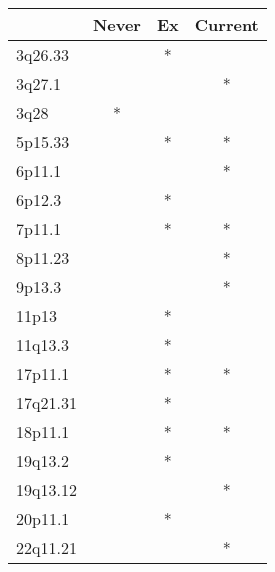 \begin{tabular}{lccc}
\toprule
{} & Never & Ex & Current \\
\midrule
3q26.33  &       &  * &         \\
3q27.1   &       &    &       * \\
3q28     &     * &    &         \\
5p15.33  &       &  * &       * \\
6p11.1   &       &    &       * \\
6p12.3   &       &  * &         \\
7p11.1   &       &  * &       * \\
8p11.23  &       &    &       * \\
9p13.3   &       &    &       * \\
11p13    &       &  * &         \\
11q13.3  &       &  * &         \\
17p11.1  &       &  * &       * \\
17q21.31 &       &  * &         \\
18p11.1  &       &  * &       * \\
19q13.2  &       &  * &         \\
19q13.12 &       &    &       * \\
20p11.1  &       &  * &         \\
22q11.21 &       &    &       * \\
\bottomrule
\end{tabular}
